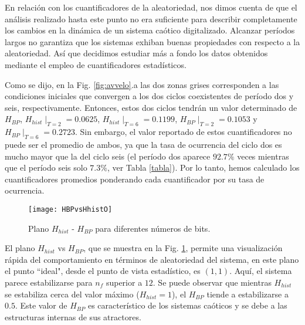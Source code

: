 En relación con los cuantificadores de la aleatoriedad, nos dimos cuenta de que el análisis realizado hasta este punto no era suficiente para describir completamente los cambios en la dinámica de un sistema caótico digitalizado.
Alcanzar períodos largos no garantiza que los sistemas exhiban buenas propiedades con respecto a la aleatoriedad.
Así que decidimos estudiar más a fondo los datos obtenidos mediante el empleo de cuantificadores estadísticos.

Como se dijo, en la Fig. \ref{fig:avvelo}.a las dos zonas grises corresponden a las condiciones iniciales que convergen a los dos ciclos coexistentes de período dos y seis, respectivamente.
Entonces, estos dos ciclos tendrán un valor determinado de  $H_{BP}$, $H_{hist}\mid_{T=2}=0.0625$, $H_{hist}\mid_{T=6}=0.1199$, $H_{BP}\mid_{T=2}=0.1053$ y $H_{BP} \mid_{T = 6} = 0.2723 $.
Sin embargo, el valor reportado de estos cuantificadores no puede ser el promedio de ambos, ya que la tasa de ocurrencia del ciclo dos es mucho mayor que la del ciclo seis (el período dos aparece $92.7 \%$ veces mientras que el período seis solo $7.3 \%$, ver Tabla \ref{tabla}).
Por lo tanto, hemos calculado los cuantificadores promedios ponderando cada cuantificador por su tasa de ocurrencia.
%
\begin{figure}
    \centering
        \texttt{[image: HBPvsHhistO]}\\
    \caption{Plano $H_{hist}$ - $H_{BP}$ para diferentes números de bits. }\label{fig:HBPvsHhist}
\end{figure}

El plano $H_{hist}$ vs $H_{BP}$, que se muestra en la Fig. \ref{fig:HBPvsHhist}, permite una visualización rápida del comportamiento en términos de aleatoriedad del sistema, en este plano el punto ``ideal", desde el punto de vista estadístico, es $(1,1)$.
Aquí, el sistema parece estabilizarse para $n_f$ superior a $12$.
Se puede observar que mientras $H_{hist}$ se estabiliza cerca del valor máximo ($ H_{hist} = 1 $), el $H_{BP}$ tiende a estabilizarse a $0.5$.
Este valor de $ H_{BP} $ es característico de los sistemas caóticos y se debe a las estructuras internas de sus atractores.

